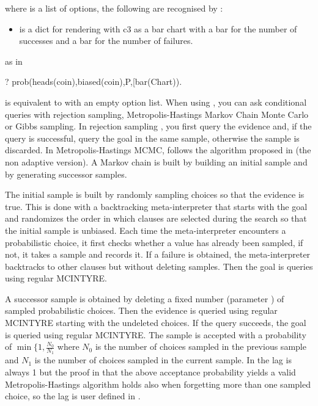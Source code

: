 \documentclass[letterpaper,10pt,english]{sphinxmanual}
\begin{document}
where  is a list of options, the following are recognised by :
\begin{itemize}
\item {} 
  is a dict for rendering with c3 as a bar chart with a bar for the number of successes and a bar for the number of failures.

\end{itemize}

as in

\begin{sphinxVerbatim}[commandchars=\\\{\}]
?\PYGZhy{} prob(heads(coin),biased(coin),P,[bar(Chart)\PYGZcb{}).
\end{sphinxVerbatim}

 is equivalent to  with an empty option list.
When using , you can ask conditional queries with rejection sampling,
Metropolis-Hastings Markov Chain Monte Carlo or Gibbs sampling.
In rejection sampling , you first query the evidence and, if the query is successful, query the goal in the same sample, otherwise the sample is discarded.
In Metropolis-Hastings MCMC,  follows the algorithm proposed in  (the non adaptive version).
A Markov chain is built by building an initial sample and by generating successor samples.

The initial sample is built by randomly sampling choices so that the evidence is true.
This is done with a backtracking meta-interpreter that starts with the goal and randomizes the order in which clauses are selected during the search so that the initial sample is unbiased.
Each time the meta-interpreter encounters a probabilistic choice, it first checks whether a value has already been sampled, if not, it takes a sample and records it.
If a failure is obtained, the meta-interpreter backtracks to other clauses but without deleting samples. Then the goal is queries using regular MCINTYRE.

A successor sample is obtained by deleting a fixed number (parameter ) of sampled probabilistic choices.
Then the evidence is queried using regular MCINTYRE starting with the undeleted choices.
If the query succeeds, the goal is queried using regular MCINTYRE.
The sample is accepted with a probability of \(\min\{1,\frac{N_0}{N_1}\) where \(N_0\) is the number of choices sampled in the previous sample and \(N_1\) is the number of choices sampled in the current sample.
In  the lag is always 1 but the proof in  that the above acceptance probability yields a valid Metropolis-Hastings algorithm holds also when forgetting more than one sampled choice, so the lag is user defined in .
\end{document}
